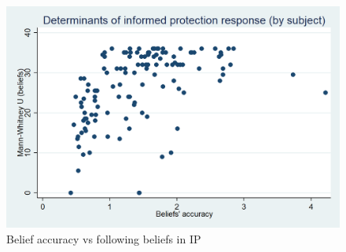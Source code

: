 \documentclass[11pt,a4paper]{article}
\begin{document}
\begin{figure}[!htbp]
\caption{Belief accuracy vs following beliefs in IP} \label{ref_question}
\centering
\includegraphics[scale=0.25]{Graphs/clustering2.png}
\end{figure}
\end{document}
